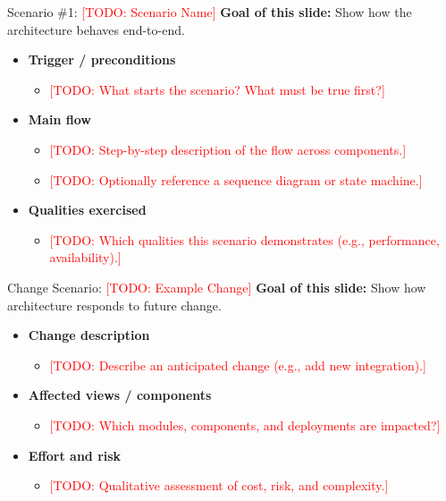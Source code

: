 \documentclass[aspectratio=169]{beamer}
\newcommand{\TODO}[1]{\textcolor{red}{[TODO: #1]}}
\begin{document}
\begin{frame}{Scenario \#1: \TODO{Scenario Name}}
  \textbf{Goal of this slide:} Show how the architecture behaves end-to-end.

  \begin{itemize}
    \item \textbf{Trigger / preconditions}
      \begin{itemize}
        \item \TODO{What starts the scenario? What must be true first?}
      \end{itemize}
    \item \textbf{Main flow}
      \begin{itemize}
        \item \TODO{Step-by-step description of the flow across components.}
        \item \TODO{Optionally reference a sequence diagram or state machine.}
      \end{itemize}
    \item \textbf{Qualities exercised}
      \begin{itemize}
        \item \TODO{Which qualities this scenario demonstrates (e.g., performance, availability).}
      \end{itemize}
  \end{itemize}
\end{frame}

\begin{frame}{Change Scenario: \TODO{Example Change}}
  \textbf{Goal of this slide:} Show how architecture responds to future change.

  \begin{itemize}
    \item \textbf{Change description}
      \begin{itemize}
        \item \TODO{Describe an anticipated change (e.g., add new integration).}
      \end{itemize}
    \item \textbf{Affected views / components}
      \begin{itemize}
        \item \TODO{Which modules, components, and deployments are impacted?}
      \end{itemize}
    \item \textbf{Effort and risk}
      \begin{itemize}
        \item \TODO{Qualitative assessment of cost, risk, and complexity.}
      \end{itemize}
  \end{itemize}
\end{frame}
\end{document}
